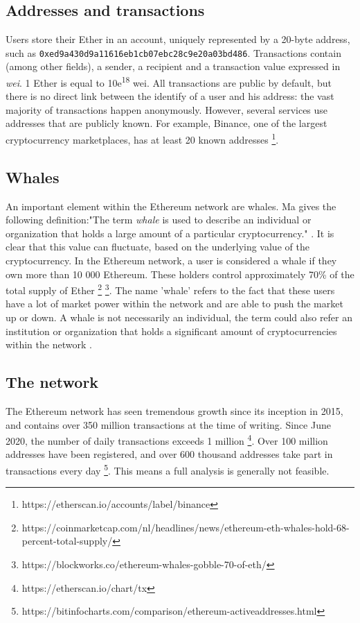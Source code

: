 \documentclass[10pt,a4paper]{article}
\begin{document}
\begin{multicols}{2}
\subsection{Addresses and transactions}
Users store their Ether in an account, uniquely represented by a 20-byte address, such as \texttt{0xed9a430d9a11616eb1cb07ebc28c9e20a03bd486}. Transactions contain (among other fields), a sender, a recipient and a transaction value expressed in \textit{wei}. 1 Ether is equal to 10e\textsuperscript{18} wei.  All transactions are public by default, but there is no direct link between the identify of a user and his address: the vast majority of transactions happen anonymously. However, several services use addresses that are publicly known. For example, Binance, one of the largest cryptocurrency marketplaces, has at least 20 known addresses \footnote{https://etherscan.io/accounts/label/binance}.
\subsection{Whales}
An important element within the Ethereum network are whales. Ma gives the following definition:"The term \textit {whale} is used to describe an individual or organization that holds a large amount of a particular cryptocurrency." \cite{ma}. It is clear that this value can fluctuate, based on the underlying value of the cryptocurrency. In the Ethereum network, a user is considered a whale if they own more than 10 000 Ethereum. These holders control approximately 70\% of the total supply of Ether \footnote {https://coinmarketcap.com/nl/headlines/news/ethereum-eth-whales-hold-68-percent-total-supply/} \footnote {https://blockworks.co/ethereum-whales-gobble-70-of-eth/}. The name 'whale' refers to the fact that these users have a lot of market power within the network and are able to push the market up or down. A whale is not necessarily an individual, the term could also refer an institution or organization that holds a significant amount of cryptocurrencies within the network \cite{ma}.


\subsection{The network}
The Ethereum network has seen tremendous growth since its inception in 2015, and contains over 350 million transactions at the time of writing. Since June 2020, the number of daily transactions exceeds 1 million \footnote{https://etherscan.io/chart/tx}. Over 100 million addresses have been registered, and over 600 thousand addresses take part in transactions every day \footnote{https://bitinfocharts.com/comparison/ethereum-activeaddresses.html}. This means a full analysis is generally not feasible.


\end{multicols}
\end{document}
